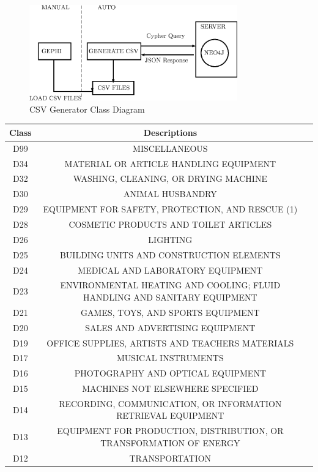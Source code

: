 \documentclass{sig-alternate}
\begin{document}
{\begin{enumerate}
\end{enumerate}
\begin{figure}[htb]
\centering
\includegraphics[width=90mm]{generate.eps}
\caption{ CSV Generator Class Diagram}
\end{figure}
\begin{table}
\begin{tabular}{|c|c|l|} \hline
 Class & Descriptions \\ \hline
D99 & MISCELLANEOUS \\ \hline
D34 & MATERIAL OR ARTICLE HANDLING EQUIPMENT\\ \hline
D32 & WASHING, CLEANING, OR DRYING MACHINE\\ \hline
D30 & ANIMAL HUSBANDRY\\ \hline
D29 & EQUIPMENT FOR SAFETY, PROTECTION, AND RESCUE (1)\\ \hline
D28 & COSMETIC PRODUCTS AND TOILET ARTICLES\\ \hline
D26 & LIGHTING\\ \hline
D25 & BUILDING UNITS AND CONSTRUCTION ELEMENTS\\ \hline
D24 & MEDICAL AND LABORATORY EQUIPMENT\\ \hline
D23 & ENVIRONMENTAL HEATING AND COOLING; FLUID HANDLING AND SANITARY EQUIPMENT\\ \hline
D21 & GAMES, TOYS, AND SPORTS EQUIPMENT\\ \hline
D20 & SALES AND ADVERTISING EQUIPMENT\\ \hline
D19 & OFFICE SUPPLIES, ARTISTS AND TEACHERS MATERIALS\\ \hline
D17 & MUSICAL INSTRUMENTS\\ \hline
D16 & PHOTOGRAPHY AND OPTICAL EQUIPMENT\\ \hline
D15 & MACHINES NOT ELSEWHERE SPECIFIED\\ \hline
D14 & RECORDING, COMMUNICATION, OR INFORMATION RETRIEVAL EQUIPMENT\\ \hline
D13 & EQUIPMENT FOR PRODUCTION, DISTRIBUTION, OR TRANSFORMATION OF ENERGY\\ \hline
D12 & TRANSPORTATION\\ \hline

\end{tabular}
\end{table}}
\end{document}
